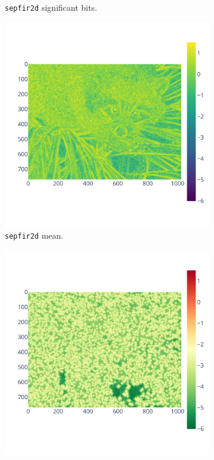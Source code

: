 \documentclass[11pt]{article}
\begin{document}
\begin{figure}
\begin{subfigure}{0.3\linewidth}
    \caption{\texttt{sepfir2d} significant bits.}
    \label{fig:bspline_input}
    \label{fig:bspline_bisplev_sig}
\end{subfigure}
\begin{subfigure}{0.3\linewidth}
    \includegraphics[width=\linewidth]{figure/bspline/bspline_mean_log.pdf}
    \caption{\texttt{sepfir2d} mean.}
    \label{fig:bspline_bisplev_mean}
\end{subfigure}
\begin{subfigure}{0.3\linewidth}
    \includegraphics[width=\linewidth]{figure/bspline/bspline_std_log.pdf}

\end{subfigure}
\end{figure}
\end{document}
